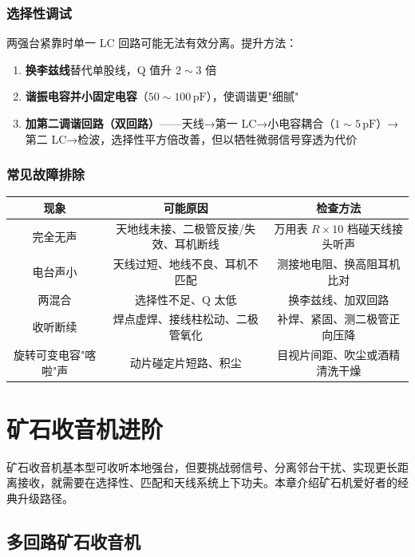 \documentclass[12pt,UTF8]{ctexbook}
\begin{document}
\subsection{选择性调试}

两强台紧靠时单一 LC 回路可能无法有效分离。提升方法：
\begin{enumerate}
\item \textbf{换李兹线}替代单股线，Q 值升 $2\sim3$ 倍
\item \textbf{谐振电容并小固定电容}（$50\sim100\,\mathrm{pF}$），使调谐更"细腻"
\item \textbf{加第二调谐回路（双回路）}——天线→第一 LC→小电容耦合（$1\sim5\,\mathrm{pF}$）→第二 LC→检波，选择性平方倍改善，但以牺牲微弱信号穿透为代价
\end{enumerate}

\subsection{常见故障排除}

\begin{center}
\begin{tabular}{c|c|c}
\hline
\textbf{现象} & \textbf{可能原因} & \textbf{检查方法} \\
\hline
完全无声 & 天地线未接、二极管反接/失效、耳机断线 & 万用表 $R\times10$ 档碰天线接头听声 \\
\hline
电台声小 & 天线过短、地线不良、耳机不匹配 & 测接地电阻、换高阻耳机比对 \\
\hline
两混合 & 选择性不足、Q 太低 & 换李兹线、加双回路 \\
\hline
收听断续 & 焊点虚焊、接线柱松动、二极管氧化 & 补焊、紧固、测二极管正向压降 \\
\hline
旋转可变电容"喀啦"声 & 动片碰定片短路、积尘 & 目视片间距、吹尘或酒精清洗干燥 \\
\hline
\end{tabular}
\end{center}


\chapter{矿石收音机进阶}
\label{chap:crystal_radio_advanced}

矿石收音机基本型可收听本地强台，但要挑战弱信号、分离邻台干扰、实现更长距离接收，就需要在选择性、匹配和天线系统上下功夫。本章介绍矿石机爱好者的经典升级路径。

\section{多回路矿石收音机}
\label{sec:multi_loop_crystal}
\end{document}
